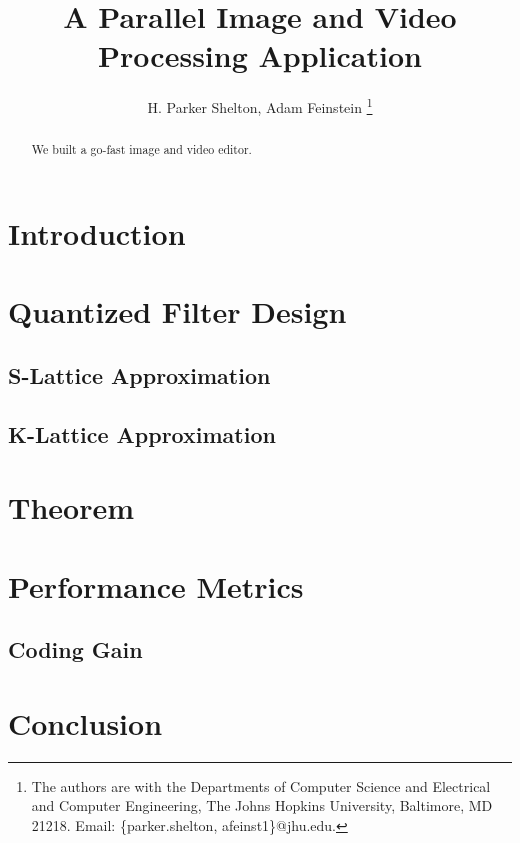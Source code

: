 \documentclass[10pt,twocolumn,twoside]{IEEEtran}
\begin{document}
\title{A Parallel Image and Video Processing Application}
\author{H. Parker Shelton, Adam Feinstein
\thanks{The authors are with the Departments of Computer Science and Electrical and Computer Engineering, The Johns Hopkins University, Baltimore, MD 21218.
Email: \{parker.shelton, afeinst1\}@jhu.edu.}}

\maketitle

\vskip -20pt

\begin{abstract}
We built a go-fast image and video editor.
\end{abstract}

\section{Introduction}

\section{Quantized Filter Design}

\subsection{S-Lattice Approximation}
\subsection{K-Lattice Approximation}
\section{Theorem}
\section{Performance Metrics}
\subsection{Coding Gain}
\section{Conclusion}



\end{document}
